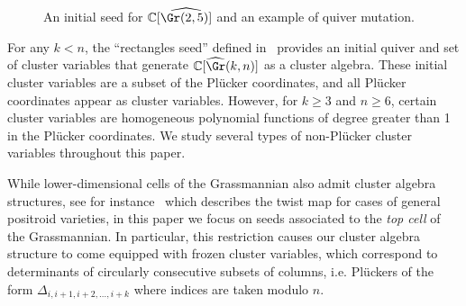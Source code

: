 \begin{exam}
\begin{figure}
\caption{An initial seed for $\mathbb{C}[\widehat{\Gr(2,5)]}$ and an example of quiver mutation.}
\label{fig:quiverandmutation}
\end{figure}

\end{exam}

For any $k<n$, the ``rectangles seed'' defined in~\cite{fwz-ch6} provides an initial quiver and set of cluster variables that generate $\mathbb{C}[\widehat{\Gr}(k,n)]$ as a cluster algebra. 
These initial cluster variables are a subset of the Pl{\"u}cker coordinates, and all Pl{\"u}cker coordinates appear as cluster variables. However, for $k \geq 3$ and $n \geq 6$, certain cluster variables are homogeneous polynomial functions of degree greater than 1 in the Pl{\"u}cker coordinates.
We study several types of non-Pl\"ucker cluster variables throughout this paper.

While lower-dimensional cells of the Grassmannian also admit cluster algebra structures, see for instance~\cite{mullerspeyer} which describes the twist map for cases of general positroid varieties, in this paper we focus on seeds associated to the \textit{top cell} of the Grassmannian. In particular, this restriction causes our cluster algebra structure to come equipped with frozen cluster variables, which correspond to determinants of circularly consecutive subsets of columns, i.e. Pl\"uckers of the form $\Delta_{i,i+1,i+2,\dots, i+k}$ where indices are taken modulo $n$.


